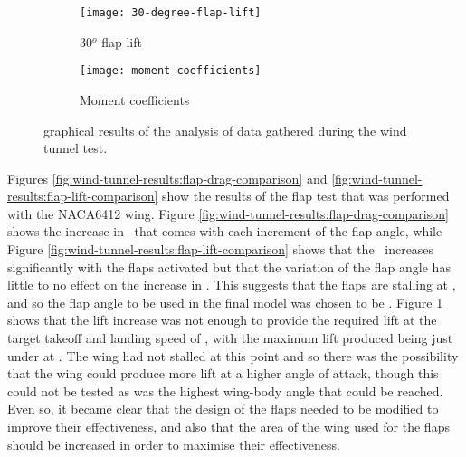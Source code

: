 \documentclass[../../main.tex]{subfiles}
\begin{document}
\begin{figure}[H]
    \begin{subfigure}[b]{\multiimagewidth\columnwidth}
        \centering
        \texttt{[image: 30-degree-flap-lift]}
        \caption{30$^o$ flap lift}
        \label{fig:wind-tunnel-results:30-degree-flap-lift}
    \end{subfigure}
    \begin{subfigure}[b]{\multiimagewidth\columnwidth}
        \centering
        \texttt{[image: moment-coefficients]}
        \caption{Moment coefficients}
        \label{fig:wind-tunnel-results:moment-coefficients}
    \end{subfigure}

    \caption{graphical results of the analysis of data gathered during the wind tunnel test.}
    \label{fig:wind-tunnel-results}
\end{figure}

Figures \ref{fig:wind-tunnel-results:flap-drag-comparison} and \ref{fig:wind-tunnel-results:flap-lift-comparison} show the results of the flap test that was performed with the NACA6412 wing.
Figure \ref{fig:wind-tunnel-results:flap-drag-comparison} shows the increase in \cd\, that comes with each increment of the flap angle, while Figure \ref{fig:wind-tunnel-results:flap-lift-comparison} shows that the \cl\, increases significantly with the flaps activated but that the variation of the flap angle has little to no effect on the increase in \cl.
This suggests that the flaps are stalling at , and so the flap angle to be used in the final model was chosen to be .
Figure \ref{fig:wind-tunnel-results:30-degree-flap-lift} shows that the lift increase was not enough to provide the required lift at the target takeoff and landing speed of , with the maximum lift produced being just under  at .
The wing had not stalled at this point and so there was the possibility that the wing could produce more lift at a higher angle of attack, though this could not be tested as  was the highest wing-body angle that could be reached.
Even so, it became clear that the design of the flaps needed to be modified to improve their effectiveness, and also that the area of the wing used for the flaps should be increased in order to maximise their effectiveness. 
\end{document}
